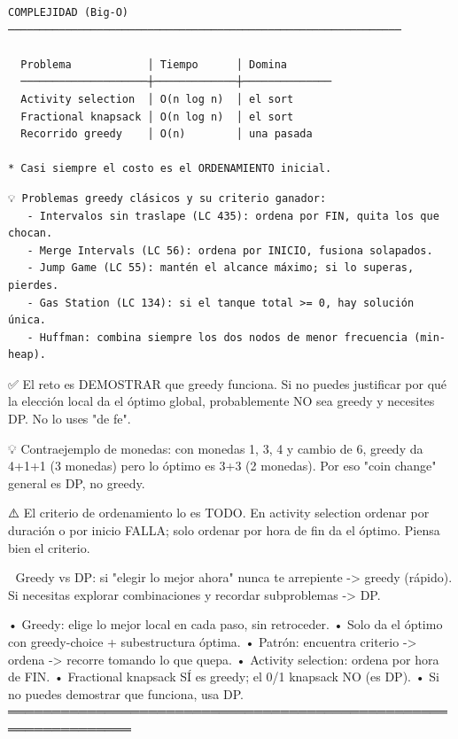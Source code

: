 \begin{lstlisting}
COMPLEJIDAD (Big-O)
──────────────────────────────────────────────────────────────

  Problema            │ Tiempo      │ Domina
  ────────────────────┼─────────────┼──────────────
  Activity selection  │ O(n log n)  │ el sort
  Fractional knapsack │ O(n log n)  │ el sort
  Recorrido greedy    │ O(n)        │ una pasada

* Casi siempre el costo es el ORDENAMIENTO inicial.
\end{lstlisting}

\begin{lstlisting}
💡 Problemas greedy clásicos y su criterio ganador:
   - Intervalos sin traslape (LC 435): ordena por FIN, quita los que chocan.
   - Merge Intervals (LC 56): ordena por INICIO, fusiona solapados.
   - Jump Game (LC 55): mantén el alcance máximo; si lo superas, pierdes.
   - Gas Station (LC 134): si el tanque total >= 0, hay solución única.
   - Huffman: combina siempre los dos nodos de menor frecuencia (min-heap).
\end{lstlisting}

\begin{dsaentrevistas}

✅ El reto es DEMOSTRAR que greedy funciona. Si no puedes justificar por
   qué la elección local da el óptimo global, probablemente NO sea greedy
   y necesites DP. No lo uses "de fe".

💡 Contraejemplo de monedas: con monedas {1, 3, 4} y cambio de 6, greedy
   da 4+1+1 (3 monedas) pero lo óptimo es 3+3 (2 monedas). Por eso "coin
   change" general es DP, no greedy.

⚠️ El criterio de ordenamiento lo es TODO. En activity selection ordenar
   por duración o por inicio FALLA; solo ordenar por hora de fin da el
   óptimo. Piensa bien el criterio.

🔑 Greedy vs DP: si "elegir lo mejor ahora" nunca te arrepiente ->
   greedy (rápido). Si necesitas explorar combinaciones y recordar
   subproblemas -> DP.

\end{dsaentrevistas}

\begin{dsaresumen}

• Greedy: elige lo mejor local en cada paso, sin retroceder.
• Solo da el óptimo con greedy-choice + subestructura óptima.
• Patrón: encuentra criterio -> ordena -> recorre tomando lo que quepa.
• Activity selection: ordena por hora de FIN.
• Fractional knapsack SÍ es greedy; el 0/1 knapsack NO (es DP).
• Si no puedes demostrar que funciona, usa DP.
════════════════════════════════════════════════════════════════

\end{dsaresumen}
